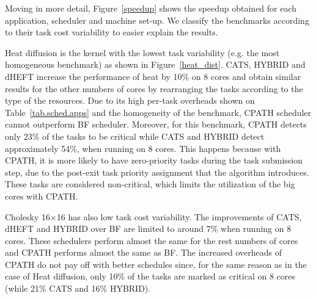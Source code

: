 Moving in more detail, Figure~\ref{speedup} shows the speedup obtained for each application,  scheduler and machine set-up.
We classify the benchmarks according to their task cost variability to easier explain the results.



Heat diffusion is the kernel with the lowest task variability (e.g. the most homogeneous benchmark) as shown in Figure~\ref{heat_dist}.
CATS, HYBRID and dHEFT increase the performance of heat by 10\% on 8 cores and obtain similar results for the other numbers of cores by rearranging the tasks according to the type of the resources.
Due to its high per-task overheads shown on Table~\ref{tab.sched.apps}
 and the homogeneity of the benchmark, CPATH scheduler cannot outperform BF scheduler. 
Moreover, for this benchmark, CPATH detects only 23\% of the tasks to be critical while CATS and HYBRID detect approximately 54\%, when running on 8 cores.
This happens because with CPATH, it is more likely to have zero-priority tasks during the task submission step, due to the post-exit task priority assignment that the algorithm introduces. 
These tasks are considered non-critical, which limits the utilization of the big cores with CPATH. 


Cholesky 16$\times$16 has also low task cost variability. 
The improvements of CATS, dHEFT and HYBRID over BF are limited to around 7\% when running on 8 cores.
These schedulers perform almost the same for the rest numbers of cores and CPATH performs almost the same as BF. 
The increased overheads of CPATH do not pay off with better schedules since, for the same reason as in the case of Heat diffusion, only 10\% of the tasks are marked as critical on 8 cores (while 21\% CATS and 16\% HYBRID).


